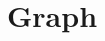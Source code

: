 \documentclass[a4paper,10pt,twocolumn,oneside]{article}
\begin{document}
% 

% 

%

% 

% 

%

% 

% 

\section{Graph}
% 
\end{document}
